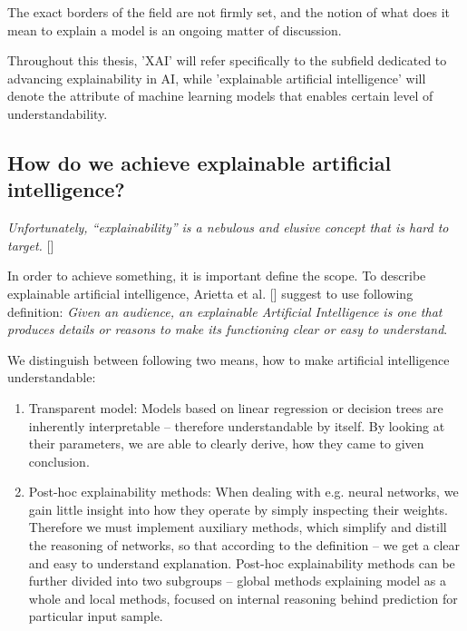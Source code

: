 
The exact borders of the field are not firmly set, and the notion of what does it mean to explain a model is an ongoing matter of discussion. 

Throughout this thesis, 'XAI' will refer specifically to the subfield dedicated to advancing explainability in AI, while 'explainable artificial intelligence' will denote the attribute of machine learning models that enables certain level of understandability.


\subsection{How do we achieve explainable artificial intelligence?}

\emph{Unfortunately, “explainability” is a nebulous and elusive concept that is hard to target.} []
\newline

In order to achieve something, it is important define the scope. To describe explainable artificial intelligence, Arietta et al. [] suggest to use following definition: \emph{Given an audience, an explainable Artificial Intelligence is one that produces details or reasons to make its functioning clear or easy to understand}.

We distinguish between following two means, how to make artificial intelligence understandable:

\begin{enumerate}
    \item Transparent model: Models based on linear regression or decision trees are inherently interpretable -- therefore understandable by itself. By looking at their parameters, we are able to clearly derive, how they came to given conclusion.
    \item Post-hoc explainability methods: When dealing with e.g. neural networks, we gain little insight into how they operate by simply inspecting their weights. Therefore we must implement auxiliary methods, which simplify and distill the reasoning of networks, so that according to the definition -- we get a clear and easy to understand explanation. Post-hoc explainability methods can be further divided into two subgroups -- global methods explaining model as a whole and local methods, focused on internal reasoning behind prediction for particular input sample.
\end{enumerate}

